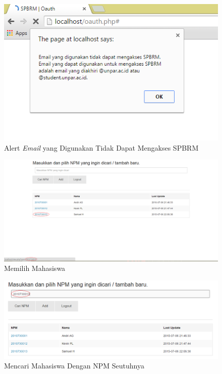 \begin{figure}[H]
\centering
\includegraphics[scale=0.44]{Gambar/pengujian7.png}
\caption[Alert {\it Email} yang Digunakan Tidak Dapat Mengakses SPBRM]{Alert {\it Email} yang Digunakan Tidak Dapat Mengakses SPBRM}
\label{fig:alert}
\end{figure}

\begin{figure}[H]
\centering
\includegraphics[scale=0.445]{Gambar/pengujian8.png}
\caption[Memilih Mahasiswa]{Memilih Mahasiswa} 
\label{fig:memilihmahasiswa}
\end{figure}

\begin{figure}[H]
\centering
\includegraphics[scale=0.44]{Gambar/pengujian9.png}
\caption[Mencari Mahasiswa Dengan NPM Seutuhnya]{Mencari Mahasiswa Dengan NPM Seutuhnya} 
\label{fig:mencarinpmutuh}
\end{figure}


